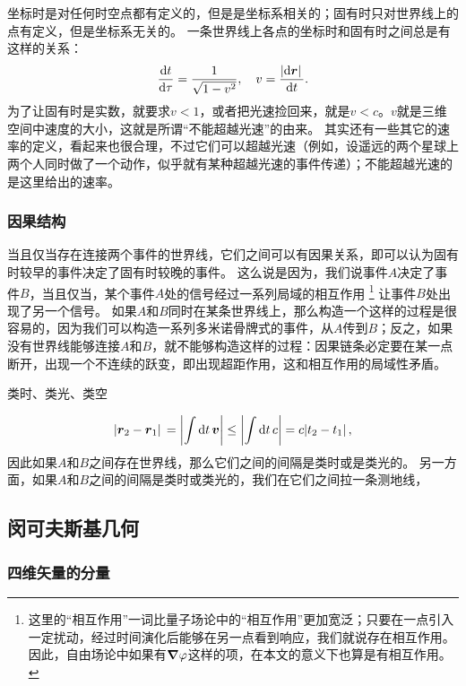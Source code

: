 \documentclass[hyperref, UTF8, a4paper]{ctexart}
\begin{document}
坐标时是对任何时空点都有定义的，但是是坐标系相关的；固有时只对世界线上的点有定义，但是坐标系无关的。
一条世界线上各点的坐标时和固有时之间总是有这样的关系：
\begin{equation}
    \dv{t}{\tau} = \frac{1}{\sqrt{1 - v^2}}, \quad v = \frac{\abs*{\dd{\vb*{r}}}}{\dd{t}}.
\end{equation}
为了让固有时是实数，就要求$v < 1$，或者把光速捡回来，就是$v < c$。$v$就是三维空间中速度的大小，这就是所谓“不能超越光速”的由来。
其实还有一些其它的速率的定义，看起来也很合理，不过它们可以超越光速（例如，设遥远的两个星球上两个人同时做了一个动作，似乎就有某种超越光速的事件传递）；不能超越光速的是这里给出的速率。

\subsubsection{因果结构}

当且仅当存在连接两个事件的世界线，它们之间可以有因果关系，即可以认为固有时较早的事件决定了固有时较晚的事件。
这么说是因为，我们说事件$A$决定了事件$B$，当且仅当，某个事件$A$处的信号经过一系列局域的相互作用%
\footnote{这里的“相互作用”一词比量子场论中的“相互作用”更加宽泛；只要在一点引入一定扰动，经过时间演化后能够在另一点看到响应，我们就说存在相互作用。因此，自由场论中如果有$\grad \varphi$这样的项，在本文的意义下也算是有相互作用。}%
让事件$B$处出现了另一个信号。
如果$A$和$B$同时在某条世界线上，那么构造一个这样的过程是很容易的，因为我们可以构造一系列多米诺骨牌式的事件，从$A$传到$B$；反之，如果没有世界线能够连接$A$和$B$，就不能够构造这样的过程：因果链条必定要在某一点断开，出现一个不连续的跃变，即出现超距作用，这和相互作用的局域性矛盾。

类时、类光、类空

\[
    \abs*{\vb*{r}_2 - \vb*{r}_1} = \abs{\int \dd{t} \vb*{v}} \leq \abs{\int \dd{t} c} = c \abs*{t_2 - t_1},
\]
因此如果$A$和$B$之间存在世界线，那么它们之间的间隔是类时或是类光的。
另一方面，如果$A$和$B$之间的间隔是类时或类光的，我们在它们之间拉一条测地线，

\subsection{闵可夫斯基几何}

\subsubsection{四维矢量的分量}\label{sec:components-of-four-vector}
\end{document}
